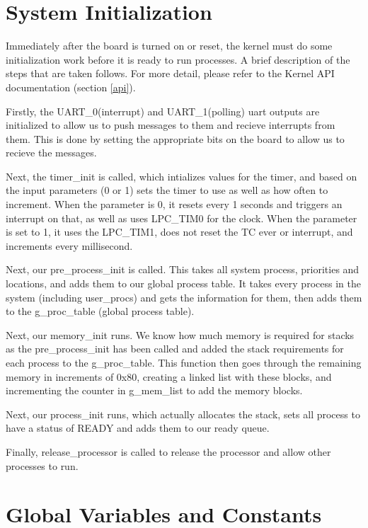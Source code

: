 \documentclass[12pt]{article}
\begin{document}
\section{System Initialization}\label{init}
Immediately after the board is turned on or reset, the kernel must do some initialization work before it is ready to run processes. A brief description of the steps that are taken follows. For more detail, please refer to the Kernel API documentation (section \ref{api}).

Firstly, the UART\_0(interrupt) and UART\_1(polling) uart outputs are initialized to allow us to push messages to them and recieve interrupts from them. This is done by setting the appropriate bits on the board to allow us to recieve the messages.

Next, the timer\_init is called, which intializes values for the timer, and based on the input parameters (0 or 1) sets the timer to use as well as how often to increment. When the parameter is 0, it resets every 1 seconds and triggers an interrupt on that, as well as uses LPC\_TIM0 for the clock. When the parameter is set to 1, it uses the LPC\_TIM1, does not reset the TC ever or interrupt, and increments every millisecond.

Next, our pre\_process\_init is called. This takes all system process, priorities and locations, and adds them to our global process table. It takes every process in the system (including user\_procs) and gets the information for them, then adds them to the g\_proc\_table (global process table).

Next, our memory\_init runs. We know how much memory is required for stacks as the pre\_process\_init has been called and added the stack requirements for each process to the g\_proc\_table. This function then goes through the remaining memory in increments of 0x80, creating a linked list with these blocks, and incrementing the counter in g\_mem\_list to add the memory blocks.

Next, our process\_init runs, which actually allocates the stack, sets all process to have a status of READY and adds them to our ready queue.

Finally, release\_processor is called to release the processor and allow other processes to run.

\newpage
\section{Global Variables and Constants}\label{globals}
\end{document}

